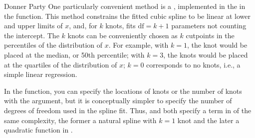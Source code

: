 \documentclass[11pt]{book}\usepackage[]{graphicx}\usepackage[]{color}
\begin{document}
\begin{Example}[donner1]{Donner Party}
One particularly convenient method is a , implemented
in the  in the  function. This method constrains the
fitted cubic spline to be linear at lower and upper limits of $x$,
and, for $k$ knots, fits $\textrm{df} = k+1$ parameters not counting the intercept.
The $k$ knots can be conveniently chosen as $k$ cutpoints in the percentiles
of the distribution of $x$.  For example, with $k=1$, the knot would be placed
at the median, or 50th percentile; with $k=3$, the knots would be placed at the
quartiles of the distribution of $x$; $k=0$ corresponds to no knots, i.e.,
a simple linear regression.

In the  function, you can specify the locations of knots or the number of knots
with the  argument, but it is conceptually simpler to specify the 
number of degrees of freedom used in the spline fit. Thus, 
 and  both specify a term in  of the same
complexity, the former a natural spline with $k=1$ knot and the later
a quadratic function in .


\end{Example}
\end{document}
